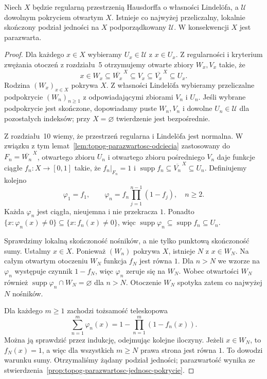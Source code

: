 \begin{twierdzenie}
\label{thm:topog-parazwartosc-lindelof}
Niech $X$ będzie regularną przestrzenią
Hausdorffa o własności Lindelöfa,
a $\mathcal U$ dowolnym pokryciem
otwartym $X$. Istnieje co najwyżej
przeliczalny, lokalnie skończony
podział jedności na $X$
podporządkowany $\mathcal U$.
W konsekwencji $X$ jest parazwarta.
\end{twierdzenie}
\begin{proof}
Dla każdego $x\in X$ wybieramy
$U_x\in\mathcal U$ z $x\in U_x$.
Z regularności i kryterium zwężania
otoczeń z rozdziału~5 otrzymujemy
otwarte zbiory $W_x,V_x$ takie, że
\[
x\in W_x\subseteq\overline{W_x}^{\,X}
\subseteq V_x\subseteq
\overline{V_x}^{\,X}\subseteq U_x.
\]
Rodzina $(W_x)_{x\in X}$ pokrywa $X$.
Z własności Lindelöfa wybieramy
przeliczalne podpokrycie
$(W_n)_{n\ge1}$ z odpowiadającymi
zbiorami $V_n$ i $U_n$.
Jeśli wybrane podpokrycie jest skończone,
dopowiadamy puste $W_n,V_n$ i dowolne
$U_n\in\mathcal U$ dla pozostałych
indeksów; przy $X=\varnothing$ twierdzenie
jest bezpośrednie.

Z rozdziału~10 wiemy, że przestrzeń
regularna i Lindelöfa jest normalna.
W związku z tym
lemat~\ref{lem:topog-parazwartosc-odciecia}
zastosowany do
$F_n=\overline{W_n}^{\,X}$,
otwartego zbioru $U_n$ i otwartego
zbioru pośredniego $V_n$ daje funkcje ciągłe
$f_n:X\to[0,1]$ takie, że
$f_n|_{F_n}=1$ i
$\operatorname{supp}f_n\subseteq
\overline{V_n}^{\,X}\subseteq U_n$.
Definiujemy kolejno
\[
\varphi_1=f_1,\qquad
\varphi_n=f_n\prod_{j=1}^{n-1}(1-f_j),
\quad n\ge2.
\]
Każda $\varphi_n$ jest ciągła,
nieujemna i nie przekracza $1$.
Ponadto $\{x:\varphi_n(x)\ne0\}
\subseteq\{x:f_n(x)\ne0\}$,
więc
$\operatorname{supp}\varphi_n
\subseteq\operatorname{supp}f_n
\subseteq U_n$.

Sprawdzimy lokalną skończoność nośników,
a nie tylko punktową skończoność sumy.
Ustalmy $x\in X$.
Ponieważ $(W_n)$ pokrywa $X$,
istnieje $N$ z $x\in W_N$.
Na całym otwartym otoczeniu $W_N$
funkcja $f_N$ jest równa $1$.
Dla $n>N$ we wzorze na $\varphi_n$
występuje czynnik $1-f_N$,
więc $\varphi_n$ zeruje się na $W_N$.
Wobec otwartości $W_N$ również
$\operatorname{supp}\varphi_n
\cap W_N=\varnothing$ dla $n>N$.
Otoczenie $W_N$ spotyka zatem
co najwyżej $N$ nośników.

Dla każdego $m\ge1$ zachodzi
tożsamość teleskopowa
\[
\sum_{n=1}^{m}\varphi_n(x)
=1-\prod_{n=1}^{m}(1-f_n(x)).
\]
Można ją sprawdzić przez indukcję,
odejmując kolejne iloczyny.
Jeżeli $x\in W_N$, to $f_N(x)=1$,
a więc dla wszystkich $m\ge N$
prawa strona jest równa $1$.
To dowodzi warunku sumy.
Otrzymaliśmy żądany podział jedności;
parazwartość wynika ze
stwierdzenia~\ref{prop:topog-parazwartosc-jednosc-pokrycie}.
\end{proof}

